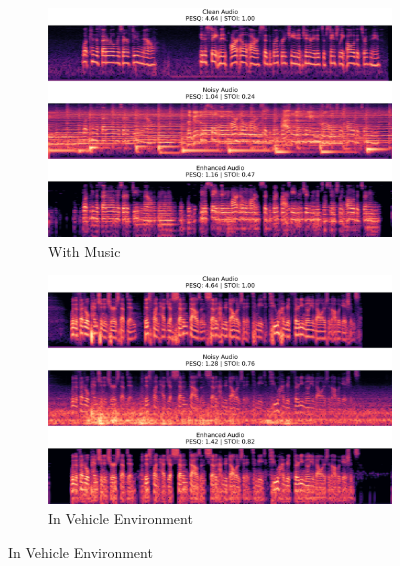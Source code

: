 \documentclass[logo,bsc,singlespacing,parskip,online]{infthesis}
\begin{document}
\begin{figure}[h]
\begin{subfigure}{0.42\textwidth}
        \centering
        \includegraphics[width=\textwidth]{music-spec.png}
        \caption{With Music}
        \label{fig:music-spec}
    \end{subfigure}%
    \hspace{0.02\textwidth}%
    \begin{subfigure}{0.42\textwidth}
        \centering
        \includegraphics[width=\textwidth]{in-vehicle-spec.png}
        \caption{In Vehicle Environment}
        \label{fig:in-vehicle-spec}
    \end{subfigure}
\end{figure}
\FloatBarrier
\end{document}
